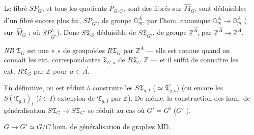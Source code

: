\documentclass[11pt,a4paper]{article}
\begin{document}

Le fibré $SP_G$, et tous les quotients $P_{G,C}$, \struck{\ill{}} sont des
fibrés sur $\widehat{M}_G$.   sont déduisibles d'un
fibré encore plus fin, $SP_{G^{\flat}}$, de groupe $\mathbb{G}_m^{\vec{A}}$,
par l'hom. canonique $\mathbb{G}_m^{\vec{A}} \to \mathbb{G}_m^{A}$
( sur $\widehat{M}_G$ ; où $SP^{\wedge}_{G^{\flat}}$). Donc
$S\mathfrak{T}_G$ déduisible de $S\mathfrak{T}_{G^{\flat}}$, de groupe
$\mathbb{Z}^{\vec{A}}$, par $\mathbb{Z}^{\vec{A}} \to \mathbb{Z}^{A}$.

\textit{NB} $\mathfrak{T}_G$ est une «  » de groupoïdes
$R\mathfrak{T}_G$ par $\mathbb{Z}^{A}$ — elle est connue quand on connaît les
ext. correspondantes $\mathfrak{T}_{G,a}$ de $R\mathfrak{T}_G$
  $\mathbb{Z}$ — et il suffit
de connaître les ext. 
 $R\mathfrak{T}_G$ par $\mathbb{Z}$ pour $\vec{a} \in \vec{A}$.


En définitive, on est réduit à construire les $S\mathfrak{T}_{g,I}$
($\simeq \mathfrak{T}^{!}_{g,\nu}$) 
(ou encore les $S(\mathfrak{T}_{g,I})_i$ ($i \in I$) extension de
$\mathfrak{T}_{g,I}$ par $\mathbb{Z}$). De même, la construction des hom. de
généralisation $S\mathfrak{T}_G \to S\mathfrak{T}_{G'}$ se réduit au cas où
$G' = G^{\natural}$ \struck{\ill{}} ($G'$ \ill{}  \ill{}).



$G \to G' \simeq G/C$ hom. de généralisation de graphes MD.
\end{document}
